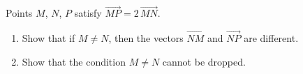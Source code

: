 Points $M$, $N$, $P$ satisfy $\overrightarrow{MP}=2\,\overrightarrow{MN}$.
\begin{enumerate}
\item[(a)] Show that if $M\ne N$, then the vectors $\overrightarrow{NM}$ and $\overrightarrow{NP}$ are different.
\item[(b)] Show that the condition $M\ne N$ cannot be dropped.
\end{enumerate}
